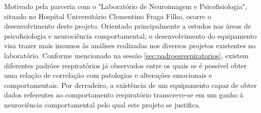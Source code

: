 	Motivado pela parceria com o "Laboratório de Neuroimagem e Psicofisiologia", situado no Hospital Universitário Clementino Fraga Filho, ocorre o desenvolvimento deste projeto. Orientado principalmente a estudos nas áreas de psicofisiologia e neurociência comportamental, o desenvolvimento do equipamento visa trazer mais insumos às análises realizadas nos diversos projetos existentes no laboratório. Conforme mencionado na sessão \ref{sec:padroesrespiratorios}, existem diferentes padrões respiratórios já observados entre os quais se é possível obter uma relação de correlação com patologias e alterações emocionais e comportamentais. Por derradeiro, a existência de um equipamento capaz de obter dados referentes ao comportamento respiratório transcreve-se em um ganho à neurociência comportamental pelo qual este projeto se justifica.
